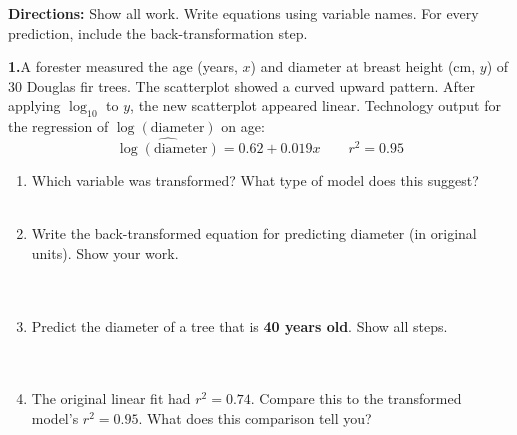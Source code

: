 \documentclass[10pt]{article}
\begin{document}
\namedateperiod

\vspace{0.18in}

\noindent\textbf{Directions:} Show all work. Write equations using variable names. For every
prediction, include the back-transformation step.

\vspace{0.14in}

\noindent\textbf{1.}\enspace A forester measured the age (years, $x$) and diameter at breast
height (cm, $y$) of 30 Douglas fir trees. The scatterplot showed a curved upward pattern.
After applying $\log_{10}$ to $y$, the new scatterplot appeared linear. Technology output
for the regression of $\log(\text{diameter})$ on age:
\[
  \widehat{\log(\text{diameter})} = 0.62 + 0.019x \qquad r^2 = 0.95
\]

\begin{enumerate}[label=\textbf{(\alph*)}, leftmargin=2em, itemsep=0.18in]

  \item Which variable was transformed? What type of model does this suggest?\\[8pt]
        \writeline\\[3pt]\writeline

  \item Write the back-transformed equation for predicting diameter (in original units).
        Show your work.\\[8pt]
        \writeline\\[3pt]\writeline\\[3pt]\writeline

  \item Predict the diameter of a tree that is \textbf{40 years old}. Show all steps.\\[8pt]
        \writeline\\[3pt]\writeline\\[3pt]\writeline

  \item The original linear fit had $r^2 = 0.74$. Compare this to the transformed model's
        $r^2 = 0.95$. What does this comparison tell you?\\[8pt]
        \writeline\\[3pt]\writeline\\[3pt]\writeline

\end{enumerate}
\end{document}
